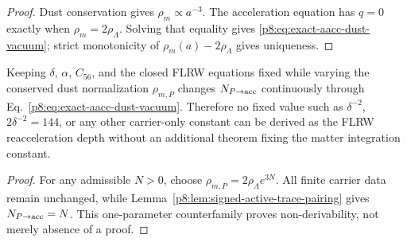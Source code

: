 \documentclass[12pt,a4paper]{article}
\begin{document}
\begin{proof}
Dust conservation gives \(\rho_m\propto a^{-3}\).  The acceleration equation
has \(q=0\) exactly when \(\rho_m=2\rho_\Lambda\).  Solving that equality
gives \eqref{p8:eq:exact-aacc-dust-vacuum}; strict monotonicity of
\(\rho_m(a)-2\rho_\Lambda\) gives uniqueness.
\end{proof}

\begin{corollary}
\label{p8:cor:active-depth-competitor-exclusion}
Keeping \(\delta\), \(\alpha\), \(C_{56}\), and the closed FLRW equations
fixed while varying the conserved dust normalization \(\rho_{m,P}\) changes
\(N_{P\to{\rm acc}}\) continuously through
Eq.~\eqref{p8:eq:exact-aacc-dust-vacuum}.  Therefore no fixed value such as
\(\delta^{-2}\), \(2\delta^{-2}=144\), or any other carrier-only constant can
be derived as the FLRW reacceleration depth without an additional theorem
fixing the matter integration constant.
\end{corollary}

\begin{proof}
For any admissible \(N>0\), choose
\(\rho_{m,P}=2\rho_\Lambda e^{3N}\).  All finite carrier data remain
unchanged, while Lemma~\ref{p8:lem:signed-active-trace-pairing} gives
\(N_{P\to{\rm acc}}=N\).  This one-parameter counterfamily proves
non-derivability, not merely absence of a proof.
\end{proof}
\end{document}
